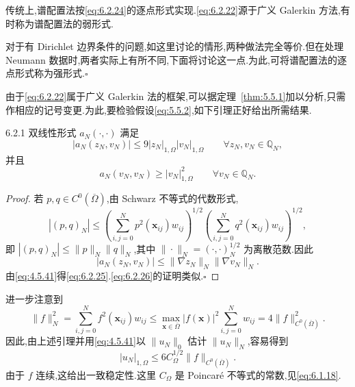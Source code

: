 \begin{note}
传统上,谱配置法按\eqref{eq:6.2.24}的逐点形式实现.\eqref{eq:6.2.22}源于广义 Galerkin 方法,有时称为谱配置法的{\heiti 弱形式}.

对于有 Dirichlet 边界条件的问题,如这里讨论的情形,两种做法完全等价.但在处理 Neumann 数据时,两者实际上有所不同,下面将讨论这一点.为此,可将谱配置法的逐点形式称为{\heiti 强形式}.\hfill\(\square\)
\end{note}

由于\eqref{eq:6.2.22}属于广义 Galerkin 法的框架,可以据定理~\ref{thm:5.5.1}加以分析,只需作相应的记号变更.为此,要检验假设\eqref{eq:5.5.2},如下引理正好给出所需结果.

\begin{lemma}[]{6.2.1}
双线性形式 \(a_N(\cdot,\cdot)\) 满足
\begin{equation}\label{eq:6.2.25}
  |a_N(z_N,v_N)|\le9|z_N|_{1,\Omega}|v_N|_{1,\Omega}
   \qquad\forall z_N,v_N\in\mathbb Q_N,
\end{equation}
并且
\begin{equation}\label{eq:6.2.26}
  a_N(v_N,v_N)\ge|v_N|_{1,\Omega}^2\qquad\forall v_N\in\mathbb Q_N.
\end{equation}
\end{lemma}

\begin{proof}
若 \(p,q\in C^0(\overline\Omega)\),由 Schwarz 不等式的代数形式,
\[
  |(p,q)_N|\le
    \left(\sum_{i,j=0}^N p^2(\boldsymbol{x}_{ij})w_{ij}\right)^{1/2}
    \left(\sum_{i,j=0}^N q^2(\boldsymbol{x}_{ij})w_{ij}\right)^{1/2},
\]
即 \(|(p,q)_N|\le\|p\|_N\|q\|_N\),其中 \(\|\cdot\|_N=(\cdot,\cdot)_N^{1/2}\) 为离散范数.因此
\[
  |a_N(z_N,v_N)|\le\|\nabla z_N\|_N\|\nabla v_N\|_N.
\]
由\eqref{eq:4.5.41}得\eqref{eq:6.2.25}.\eqref{eq:6.2.26}的证明类似.\hfill\(\square\)
\end{proof}

进一步注意到
\begin{equation}\label{eq:6.2.27}
  \|f\|_N^2=\sum_{i,j=0}^N f^2(\boldsymbol{x}_{ij})w_{ij}
  \le\max_{\boldsymbol{x}\in\overline\Omega}|f(\boldsymbol{x})|^2
        \sum_{i,j=0}^N w_{ij}
  =4\|f\|_{C^0(\overline\Omega)}^2.
\end{equation}
因此,由上述引理并用\eqref{eq:4.5.41}以 \(\|u_N\|_0\) 估计 \(\|u_N\|_N\),容易得到
\[
  |u_N|_{1,\Omega}\le6C_\Omega^{1/2}\|f\|_{C^0(\overline\Omega)}.
\]
由于 \(f\) 连续,这给出一致稳定性.这里 \(C_\Omega\) 是 Poincaré 不等式的常数,见\eqref{eq:6.1.18}.

